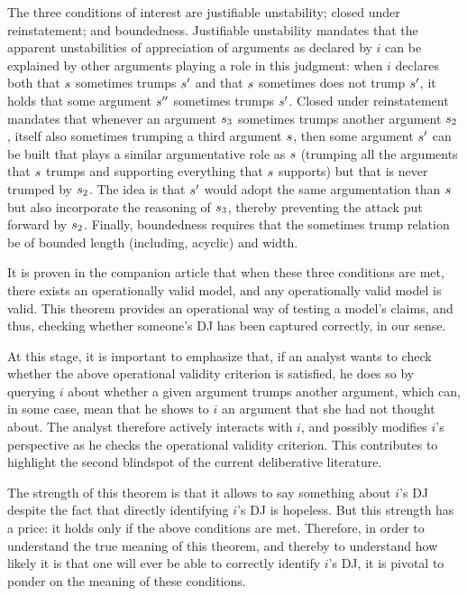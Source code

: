 \documentclass[version=3.21, pagesize, twoside=off, bibliography=totoc, DIV=calc, fontsize=12pt, a4paper, french, english]{scrartcl}
\begin{document}
The three conditions of interest are justifiable unstability; closed under reinstatement; and boundedness. Justifiable unstability mandates that the apparent unstabilities of appreciation of arguments as declared by $i$ can be explained by other arguments playing a role in this judgment: when $i$ declares both that $s$ sometimes trumps $s'$ and that $s$ sometimes does not trump $s'$, it holds that some argument $s''$ sometimes trumps $s'$. Closed under reinstatement mandates that whenever an argument $s_3$ sometimes trumps another argument $s_2$, itself also sometimes trumping a third argument $s$, then some argument $s'$ can be built that plays a similar argumentative role as $s$ (trumping all the arguments that $s$ trumps and supporting everything that $s$ supports) but that is never trumped by $s_2$. The idea is that $s'$ would adopt the same argumentation than $s$ but also incorporate the reasoning of $s_3$, thereby preventing the attack put forward by $s_2$. Finally, boundedness requires that the sometimes trump relation be of bounded length (including, acyclic) and width.

It is proven in the companion article that when these three conditions are met, there exists an operationally valid model, and any operationally valid model is valid. This theorem provides an operational way of testing a model’s claims, and thus, checking whether someone’s \ac{DJ} has been captured correctly, in our sense.

At this stage, it is important to emphasize that, if an analyst wants to check whether the above operational validity criterion is satisfied, he does so by querying $i$ about whether a given argument trumps another argument, which can, in some case, mean that he shows to $i$ an argument that she had not thought about. 
The analyst therefore actively interacts with $i$, and possibly modifies $i$’s perspective as he checks the operational validity criterion. 
This contributes to highlight the second blindspot of the current deliberative literature.

The strength of this theorem is that it allows to say something about $i$'s \ac{DJ} despite the fact that directly identifying $i$'s \ac{DJ} is hopeless. 
But this strength has a price: it holds only if the above conditions are met. 
Therefore, in order to understand the true meaning of this theorem, and thereby to understand how likely it is that one will ever be able to correctly identify $i$'s \ac{DJ}, it is pivotal to ponder on the meaning of these conditions.
\end{document}
